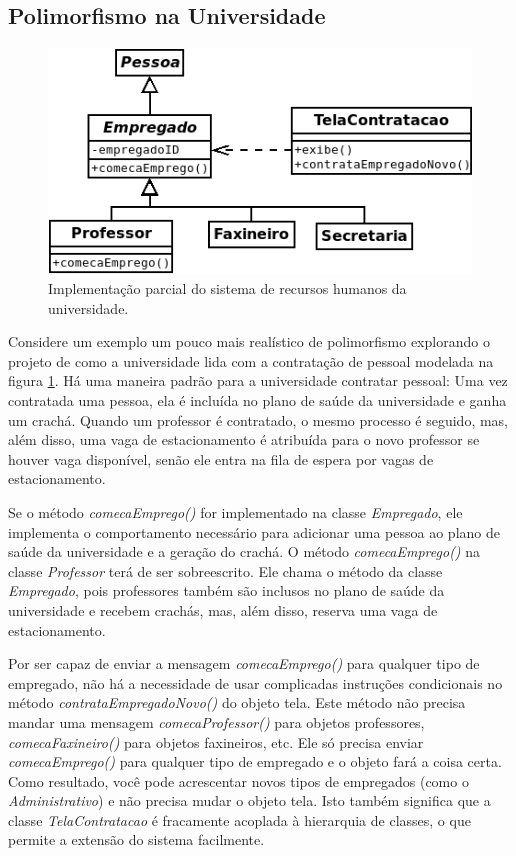 \documentclass[
	11pt,				%
	openright,
	twoside,			%
	a4paper,			%
	english,			%
	french,
	brazil,				%
	sumario=tradicional
	]{abntex2}
\begin{document}
\subsection{Polimorfismo na Universidade}
\begin{figure}
\begin{center}
\includegraphics[scale=0.65]{uniRH.png}
\end{center}
\caption{Implementação parcial do sistema de recursos humanos da universidade.} \label{fig:uniRH}
\end{figure}

Considere um exemplo um pouco mais realístico de polimorfismo explorando o projeto de como a universidade lida com a contratação de pessoal modelada na figura \ref{fig:uniRH}. Há uma maneira padrão para a universidade contratar pessoal: Uma vez contratada uma pessoa, ela é incluída no plano de saúde da universidade e ganha um crachá. Quando um professor é contratado, o mesmo processo é seguido, mas, além disso, uma vaga de estacionamento é atribuída para o novo professor se houver vaga disponível, senão ele entra na fila de espera por vagas de estacionamento.

Se o método \emph{comecaEmprego()} for implementado na classe \emph{Empregado}, ele implementa o comportamento necessário para adicionar uma pessoa ao plano de saúde da universidade e a geração do crachá. O método \emph{comecaEmprego()} na classe \emph{Professor} terá de ser sobreescrito. Ele chama o método da classe \emph{Empregado}, pois professores também são inclusos no plano de saúde da universidade e recebem crachás, mas, além disso, reserva uma vaga de estacionamento.

Por ser capaz de enviar a mensagem \emph{comecaEmprego()} para qualquer tipo de empregado, não há a necessidade de usar complicadas instruções condicionais no método \emph{contrataEmpregadoNovo()} do objeto tela. Este método não precisa mandar uma mensagem \emph{comecaProfessor()} para objetos professores, \emph{comecaFaxineiro()} para objetos faxineiros, etc. Ele só precisa enviar \emph{comecaEmprego()} para qualquer tipo de empregado e o objeto fará a coisa certa. Como resultado, você pode acrescentar novos tipos de empregados (como o \emph{Administrativo}) e não precisa mudar o objeto tela. Isto também significa que a classe \emph{TelaContratacao} é fracamente acoplada à hierarquia de classes, o que permite a extensão do sistema facilmente.
\end{document}
